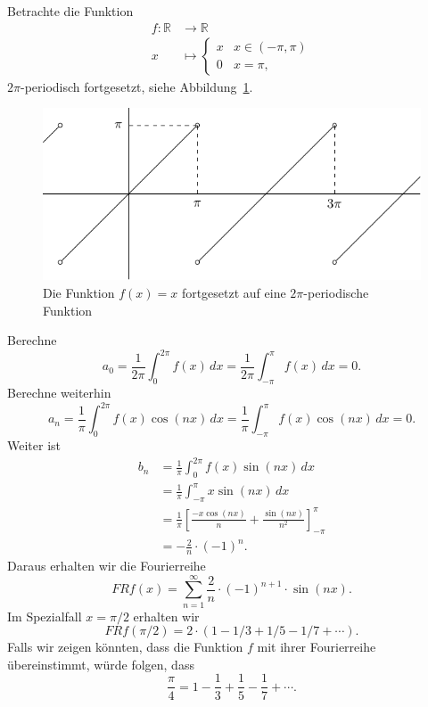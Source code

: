 \documentclass[../main.tex]{subfiles}
\begin{document}
\begin{example}
  Betrachte die Funktion
  \begin{align*}
    f \colon \mathbb{R} & \to \mathbb{R} \\
    x & \mapsto 
    \begin{cases}
      x & x \in (- \pi, \pi)\\
      0 & x = \pi,
    \end{cases}
  \end{align*}
  $2\pi$-periodisch fortgesetzt, siehe Abbildung~\ref{fig:linear}.

\begin{figure}[htb]
  \centering
  \includegraphics{images/linear}
  \caption{Die Funktion $f(x) = x$ fortgesetzt auf eine
  $2\pi$-periodische Funktion}%
  \label{fig:linear}
\end{figure}

  Berechne
  \[
    a_0 = \frac{1}{2\pi}\int_{0}^{2\pi} f(x) \, dx
    = \frac{1}{2\pi} \int_{-\pi}^{\pi} f(x) \, dx = 0.
  \]
  Berechne weiterhin
  \[
    a_n = \frac{1}{\pi} \int_{0}^{2\pi} f(x) \cos(nx) \, dx
    = \frac{1}{\pi} \int_{-\pi}^{\pi} f(x) \cos(nx) \, dx = 0.
  \]
  Weiter ist
  \begin{align*}
    b_n
    & = \frac{1}{\pi} \int_{0}^{2\pi} f(x) \sin(nx) \, dx\\
    &= \frac{1}{\pi} \int_{-\pi}^{\pi} x \sin(nx) \, dx \\
    &= \frac{1}{\pi}
    {\left[ \frac{-x \cos(nx)}{n} + \frac{\sin(nx)}{n^2} \right]}_{-\pi}^{\pi}\\
    &= -\frac{2}{n} \cdot {(-1)}^n.
  \end{align*}
  Daraus erhalten wir die Fourierreihe
  \[
    FRf(x) = \sum_{n=1}^{\infty} \frac{2}{n} \cdot {(-1)}^{n + 1} \cdot \sin(nx).
  \]
  Im Spezialfall $x = \pi/2$ erhalten wir
  \[
    FRf(\pi/2) = 2 \cdot (1 - 1/3 + 1/5 - 1/7 + \cdots).
  \]
  Falls wir zeigen könnten, dass die Funktion $f$ mit ihrer Fourierreihe
  übereinstimmt, würde folgen, dass
  \[
    \frac{\pi}{4} = 1 - \frac{1}{3} + \frac{1}{5} - \frac{1}{7} + \cdots.
  \]
\end{example}
\end{document}
